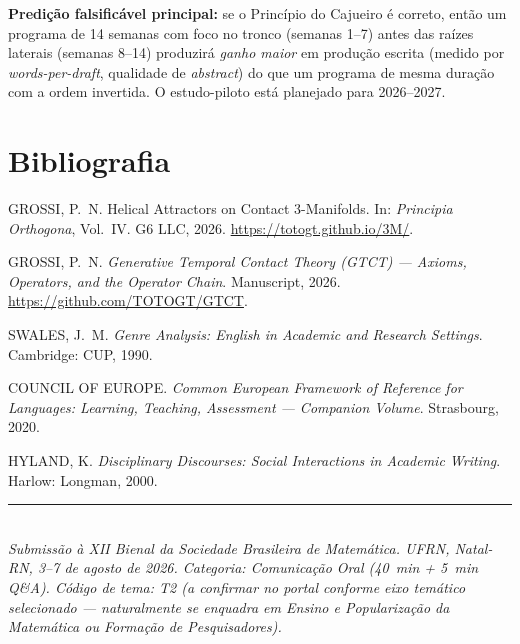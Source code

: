 \documentclass[11pt,a4paper]{article}
\begin{document}
\noindent \textbf{Predição falsificável principal:} se o Princípio do Cajueiro é correto, então um programa de 14 semanas com foco no tronco (semanas 1--7) antes das raízes laterais (semanas 8--14) produzirá \emph{ganho maior} em produção escrita (medido por \emph{words-per-draft}, qualidade de \emph{abstract}) do que um programa de mesma duração com a ordem invertida. O estudo-piloto está planejado para 2026--2027.

\section*{Bibliografia}

\begin{enumerate}[leftmargin=2em,itemsep=0em,label={[\arabic*]}]
  \item GROSSI, P.~N. Helical Attractors on Contact 3-Manifolds. In: \emph{Principia Orthogona}, Vol.~IV. G6 LLC, 2026. \url{https://totogt.github.io/3M/}.
  \item GROSSI, P.~N. \emph{Generative Temporal Contact Theory (GTCT) --- Axioms, Operators, and the Operator Chain}. Manuscript, 2026. \url{https://github.com/TOTOGT/GTCT}.
  \item SWALES, J.~M. \emph{Genre Analysis: English in Academic and Research Settings}. Cambridge: CUP, 1990.
  \item COUNCIL OF EUROPE. \emph{Common European Framework of Reference for Languages: Learning, Teaching, Assessment --- Companion Volume}. Strasbourg, 2020.
  \item HYLAND, K. \emph{Disciplinary Discourses: Social Interactions in Academic Writing}. Harlow: Longman, 2000.
\end{enumerate}

\vspace{1em}
\noindent\rule{\linewidth}{0.3pt}\\[0.3em]
\footnotesize
\emph{Submissão à XII Bienal da Sociedade Brasileira de Matemática. UFRN, Natal-RN, 3--7 de agosto de 2026. Categoria: Comunicação Oral (40~min + 5~min Q\&A). Código de tema: T2 (a confirmar no portal conforme eixo temático selecionado --- naturalmente se enquadra em \emph{Ensino e Popularização da Matemática} ou \emph{Formação de Pesquisadores}).}
\end{document}
